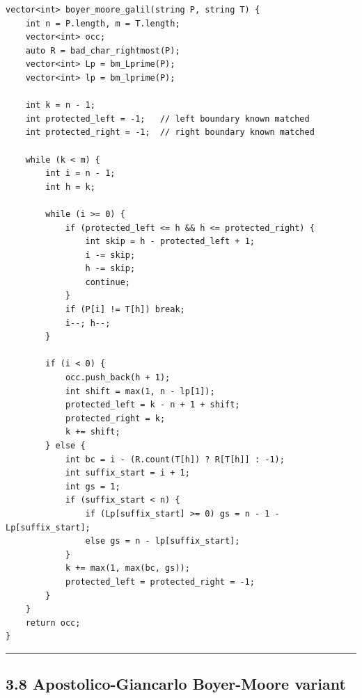 \documentclass[11pt]{article}
\begin{document}
\begin{verbatim}
vector<int> boyer_moore_galil(string P, string T) {
    int n = P.length, m = T.length;
    vector<int> occ;
    auto R = bad_char_rightmost(P);
    vector<int> Lp = bm_Lprime(P);
    vector<int> lp = bm_lprime(P);

    int k = n - 1;
    int protected_left = -1;   // left boundary known matched
    int protected_right = -1;  // right boundary known matched

    while (k < m) {
        int i = n - 1;
        int h = k;

        while (i >= 0) {
            if (protected_left <= h && h <= protected_right) {
                int skip = h - protected_left + 1;
                i -= skip;
                h -= skip;
                continue;
            }
            if (P[i] != T[h]) break;
            i--; h--;
        }

        if (i < 0) {
            occ.push_back(h + 1);
            int shift = max(1, n - lp[1]);
            protected_left = k - n + 1 + shift;
            protected_right = k;
            k += shift;
        } else {
            int bc = i - (R.count(T[h]) ? R[T[h]] : -1);
            int suffix_start = i + 1;
            int gs = 1;
            if (suffix_start < n) {
                if (Lp[suffix_start] >= 0) gs = n - 1 - Lp[suffix_start];
                else gs = n - lp[suffix_start];
            }
            k += max(1, max(bc, gs));
            protected_left = protected_right = -1;
        }
    }
    return occ;
}
\end{verbatim}

\begin{center}\rule{0.5\linewidth}{0.5pt}\end{center}

\subsection{3.8 Apostolico-Giancarlo Boyer-Moore variant}\label{apostolico-giancarlo-boyer-moore-variant}
\end{document}
